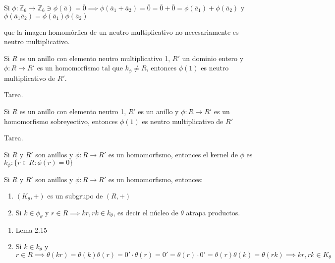 \begin{ejemplo}
    Si $\phi:\mathbb{Z}_6\to \mathbb{Z}_6\ni \phi(\bar{a})=\bar{0}\implies \phi(\bar{a}_1+\bar{a}_2)=\bar{0}=\bar{0}+\bar{0} =\phi(\bar{a}_1)+\phi(\bar{a}_2)$ y $\phi(\bar{a}_1\bar{a}_2)=\phi(\bar{a}_1)\phi(\bar{a}_2)$ 
    
    que la imagen homomórfica de un neutro multiplicativo no necesariamente es neutro multiplicativo. 
\end{ejemplo}
\begin{prop}
    Si $R$ es un anillo con elemento neutro multiplicativo 1, $R'$ un dominio entero y $\phi:R\to R'$ es un homomorfismo tal que $k_\phi\neq R$, entonces $\phi(1)$ es neutro multiplicativo de $R'$. 
    \begin{dem}
        Tarea.
    \end{dem}
\end{prop}

\begin{prop}
    Si $R$ es un anillo con elemento neutro 1, $R'$ es un anillo y $\phi:R\to R'$ es un homomorfismo sobreyectivo, entonces $\phi(1)$ es neutro multiplicativo de $R'$
    \begin{dem}
        Tarea.
    \end{dem}
\end{prop}

\begin{definicion}
    Si $R$ y $R'$ son anillos y $\phi:R\to R'$ es un homomorfismo, entonces el kernel de $\phi$ es $k_\phi:\{r\in R:\phi(r)=0\}$
\end{definicion}
\begin{lema}[3.4]
    Si $R$ y $R'$ son anillos y $\phi:R\to R'$ es un homomorfismo, entonces:
    \begin{enumerate}
        \item $(K_\theta, +)$ es un subgrupo de $(R,+)$ 
        \item Si $k\in\phi_\theta$ y $r\in R\implies kr,rk\in k_\theta$, es decir el núcleo de $\theta$ atrapa productos.  
    \end{enumerate}
    \begin{dem}
        \begin{enumerate}
            \item Lema 2.15
            \item Si $k\in k_\theta$ y $r\in R\implies \theta(kr)=\theta(k)\theta(r)=0'\cdot \theta(r)=0'=\theta(r)\cdot 0'=\theta(r)\theta(k)=\theta(rk)\implies kr,rk\in K_\theta$
        \end{enumerate}
    \end{dem}
\end{lema}

